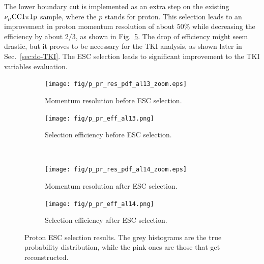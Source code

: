    The lower boundary cut is implemented as an extra step on the existing $\nu_{\mu}\textrm{CC}1\pi1\textrm{p}$ sample, where the $p$ stands for proton.
   This selection leads to an improvement in proton momentum resolution of about $50\%$ while decreasing the efficiency by about $2/3$, as shown in Fig.~\ref{fig:pprESC-res}.   
   The drop of efficiency might seem drastic, but it proves to be necessary for the TKI analysis, as shown later in Sec.~\ref{sec:do-TKI}. The ESC selection leads to significant improvement to the TKI variables evaluation. 

   \begin{figure}[t]
      \centering
      \begin{subfigure}{0.45\textwidth}
           \texttt{[image: fig/p\_pr\_res\_pdf\_al13\_zoom.eps]}
           \caption{Momentum resolution before ESC selection.}
           \label{fig:ppr-res-bfESC}
      \end{subfigure}
      \begin{subfigure}{0.45\textwidth}
           \texttt{[image: fig/p\_pr\_eff\_al13.png]}
           \caption{Selection efficiency before ESC selection.}
           \label{fig:ppr-eff-bfESC}
      \end{subfigure}
      \\
      \begin{subfigure}{0.45\textwidth}
           \texttt{[image: fig/p\_pr\_res\_pdf\_al14\_zoom.eps]}
           \caption{Momentum resolution after ESC selection.}
           \label{fig:ppr-res-afESC}
      \end{subfigure}
      \begin{subfigure}{0.45\textwidth}
           \texttt{[image: fig/p\_pr\_eff\_al14.png]}
           \caption{Selection efficiency after ESC selection.}
           \label{fig:ppr-eff-afESC}
      \end{subfigure}
      \caption{Proton ESC selection results. The grey histograms are the true probability distribution, while the pink ones are those that get reconstructed. }
      \label{fig:pprESC-res}
   \end{figure}

    
